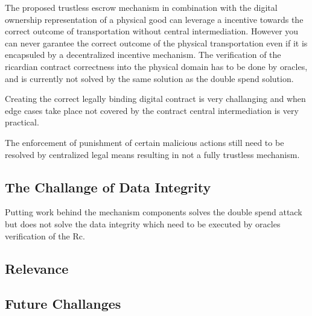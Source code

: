 
The proposed trustless escrow mechanism in combination with the digital ownership representation of a physical good can leverage a incentive towards the correct outcome of transportation without central intermediation. However you can never garantee the correct outcome of the physical transportation even if it is encapsuled by a decentralized incentive mechanism. The verification of the ricardian contract correctness into the physical domain has to be done by oracles, and is currently not solved by the same solution as the double spend solution.\par
Creating the correct legally binding digital contract is very challanging and when edge cases take place not covered by the contract central intermediation is very practical. \par
The enforcement of punishment of certain malicious actions still need to be resolved by centralized legal means resulting in not a fully trustless mechanism. \par

\subsection{The Challange of Data Integrity}

Putting work behind the mechanism components solves the double spend attack but does not solve the data integrity which need to be executed by oracles verification of the Rc.

\subsection{Relevance}

\subsection{Future Challanges}

